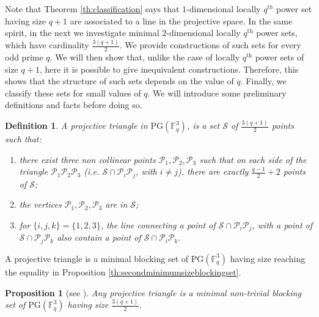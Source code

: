 \documentclass[12pt]{amsart}
\newtheorem{definition}{Definition}
\newtheorem{proposition}[theorem]{Proposition}
\newcommand{\F}{{\mathbb F}}
\newcommand{\PG}{\mathrm{PG}}
\begin{document}
Note that Theorem \ref{th:classification} says that $1$-dimensional locally $q^{th}$ power set having size $q+1$ are associated to a line in the projective space. In the same spirit, in the next we investigate minimal $2$-dimensional locally $q^{\text{th}}$ power sets, which have cardinality $\frac{3(q+1)}{2}$. We provide constructions of such sets for every odd prime $q$. We will then show that, unlike the case of locally $q^{\text{th}}$ power sets of size $q+1$, here it is possible to give inequivalent constructions. Therefore, this shows that the structure of such sets depends on the value of $q$. Finally, we classify these sets for small values of $q$. We will introduce some preliminary definitions and facts before doing so.

\begin{definition}
A \textit{projective triangle} in $\PG(\F_{q}^{3})$, is a set $\mathcal{S}$ of $\frac{3(q+1)}{2}$ points such that:
\begin{enumerate}
    \item there exist three non collinear points $\mathcal{P}_1, \mathcal{P}_2,\mathcal{P}_3$ such that on each side of the triangle $\mathcal{P}_1 \mathcal{P}_2\mathcal{P}_3$ (i.e. $\mathcal{S} \cap \mathcal{P}_i\mathcal{P}_j$, with $i\neq j$), there are exactly $\frac{q-1}{2}+2$ points of $\mathcal{S}$;\vspace{2mm}
    
    \item the vertices $\mathcal{P}_1,\mathcal{P}_2,\mathcal{P}_3$ are in $\mathcal{S}$;\vspace{2mm}
    
    \item for $\{i,j,k\}=\{1,2,3\}$, the line connecting a point of $\mathcal{S} \cap \mathcal{P}_i \mathcal{P}_j$, with a point of $\mathcal{S} \cap \mathcal{P}_j \mathcal{P}_k$ also contain a point of $\mathcal{S} \cap \mathcal{P}_i \mathcal{P}_k$. 
\end{enumerate}
\end{definition}

A projective triangle is a minimal blocking set of $\PG(\F_{q}^{3})$ having size reaching the equality in Proposition \ref{th:secondminimumsizeblockingset}.

\begin{proposition} [see \textnormal{\cite[Lemma 13.6 (i)]{hirschfeld1998projective}}] \label{th:projectivetriangleminimal}
Any projective triangle is a minimal non-trivial blocking set of $\PG(\F_{q}^{3})$ having size $\frac{3(q+1)}{2}$.
\end{proposition}
\end{document}
